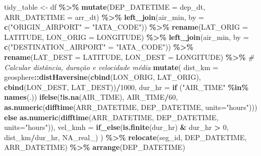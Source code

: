 \documentclass[
]{article}
\newenvironment{Shaded}{\begin{snugshade}}{\end{snugshade}}
\newcommand{\AttributeTok}[1]{\textcolor[rgb]{0.13,0.29,0.53}{#1}}
\newcommand{\CommentTok}[1]{\textcolor[rgb]{0.56,0.35,0.01}{\textit{#1}}}
\newcommand{\ConstantTok}[1]{\textcolor[rgb]{0.56,0.35,0.01}{#1}}
\newcommand{\ControlFlowTok}[1]{\textcolor[rgb]{0.13,0.29,0.53}{\textbf{#1}}}
\newcommand{\DecValTok}[1]{\textcolor[rgb]{0.00,0.00,0.81}{#1}}
\newcommand{\FunctionTok}[1]{\textcolor[rgb]{0.13,0.29,0.53}{\textbf{#1}}}
\newcommand{\NormalTok}[1]{#1}
\newcommand{\OtherTok}[1]{\textcolor[rgb]{0.56,0.35,0.01}{#1}}
\newcommand{\SpecialCharTok}[1]{\textcolor[rgb]{0.81,0.36,0.00}{\textbf{#1}}}
\newcommand{\StringTok}[1]{\textcolor[rgb]{0.31,0.60,0.02}{#1}}
\begin{document}
\begin{Shaded}
\begin{Highlighting}[]
\NormalTok{  tidy\_table }\OtherTok{\textless{}{-}}\NormalTok{ df }\SpecialCharTok{\%\textgreater{}\%}
    \FunctionTok{mutate}\NormalTok{(}\AttributeTok{DEP\_DATETIME =}\NormalTok{ dep\_dt, }\AttributeTok{ARR\_DATETIME =}\NormalTok{ arr\_dt) }\SpecialCharTok{\%\textgreater{}\%}
    \FunctionTok{left\_join}\NormalTok{(air\_min, }\AttributeTok{by =} \FunctionTok{c}\NormalTok{(}\StringTok{"ORIGIN\_AIRPORT"} \OtherTok{=} \StringTok{"IATA\_CODE"}\NormalTok{)) }\SpecialCharTok{\%\textgreater{}\%}
    \FunctionTok{rename}\NormalTok{(}\AttributeTok{LAT\_ORIG =}\NormalTok{ LATITUDE, }\AttributeTok{LON\_ORIG =}\NormalTok{ LONGITUDE) }\SpecialCharTok{\%\textgreater{}\%}
    \FunctionTok{left\_join}\NormalTok{(air\_min, }\AttributeTok{by =} \FunctionTok{c}\NormalTok{(}\StringTok{"DESTINATION\_AIRPORT"} \OtherTok{=} \StringTok{"IATA\_CODE"}\NormalTok{)) }\SpecialCharTok{\%\textgreater{}\%}
    \FunctionTok{rename}\NormalTok{(}\AttributeTok{LAT\_DEST =}\NormalTok{ LATITUDE, }\AttributeTok{LON\_DEST =}\NormalTok{ LONGITUDE) }\SpecialCharTok{\%\textgreater{}\%}
    \CommentTok{\# Calcular distância, duração e velocidade média}
    \FunctionTok{mutate}\NormalTok{(}
      \AttributeTok{dist\_km =}\NormalTok{ geosphere}\SpecialCharTok{::}\FunctionTok{distHaversine}\NormalTok{(}\FunctionTok{cbind}\NormalTok{(LON\_ORIG, LAT\_ORIG), }\FunctionTok{cbind}\NormalTok{(LON\_DEST, LAT\_DEST))}\SpecialCharTok{/}\DecValTok{1000}\NormalTok{,}
      \AttributeTok{dur\_hr  =} \ControlFlowTok{if}\NormalTok{ (}\StringTok{"AIR\_TIME"} \SpecialCharTok{\%in\%} \FunctionTok{names}\NormalTok{(.))}
        \FunctionTok{ifelse}\NormalTok{(}\SpecialCharTok{!}\FunctionTok{is.na}\NormalTok{(AIR\_TIME), AIR\_TIME}\SpecialCharTok{/}\DecValTok{60}\NormalTok{,}
               \FunctionTok{as.numeric}\NormalTok{(}\FunctionTok{difftime}\NormalTok{(ARR\_DATETIME, DEP\_DATETIME, }\AttributeTok{units=}\StringTok{"hours"}\NormalTok{)))}
      \ControlFlowTok{else} \FunctionTok{as.numeric}\NormalTok{(}\FunctionTok{difftime}\NormalTok{(ARR\_DATETIME, DEP\_DATETIME, }\AttributeTok{units=}\StringTok{"hours"}\NormalTok{)),}
      \AttributeTok{vel\_kmh =} \FunctionTok{if\_else}\NormalTok{(}\FunctionTok{is.finite}\NormalTok{(dur\_hr) }\SpecialCharTok{\&}\NormalTok{ dur\_hr }\SpecialCharTok{\textgreater{}} \DecValTok{0}\NormalTok{, dist\_km}\SpecialCharTok{/}\NormalTok{dur\_hr, }\ConstantTok{NA\_real\_}\NormalTok{)}
\NormalTok{    ) }\SpecialCharTok{\%\textgreater{}\%}
    \FunctionTok{relocate}\NormalTok{(seg\_id, DEP\_DATETIME, ARR\_DATETIME) }\SpecialCharTok{\%\textgreater{}\%}
    \FunctionTok{arrange}\NormalTok{(DEP\_DATETIME)}
  

\end{Highlighting}
\end{Shaded}
\end{document}
